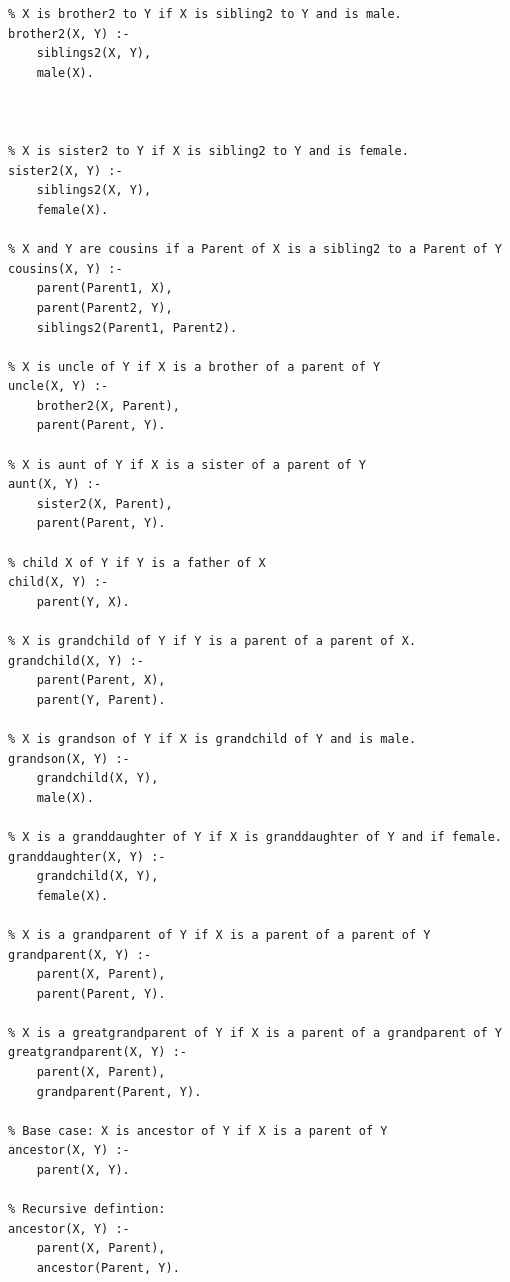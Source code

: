 \documentclass{article}
\begin{document}
\begin{verbatim}
% X is brother2 to Y if X is sibling2 to Y and is male.
brother2(X, Y) :-
    siblings2(X, Y),
    male(X).



% X is sister2 to Y if X is sibling2 to Y and is female.
sister2(X, Y) :-
    siblings2(X, Y),
    female(X).

% X and Y are cousins if a Parent of X is a sibling2 to a Parent of Y
cousins(X, Y) :-
    parent(Parent1, X),
    parent(Parent2, Y),
    siblings2(Parent1, Parent2).

% X is uncle of Y if X is a brother of a parent of Y
uncle(X, Y) :-
    brother2(X, Parent),
    parent(Parent, Y).

% X is aunt of Y if X is a sister of a parent of Y
aunt(X, Y) :-
    sister2(X, Parent),
    parent(Parent, Y).

% child X of Y if Y is a father of X
child(X, Y) :-
    parent(Y, X).

% X is grandchild of Y if Y is a parent of a parent of X.
grandchild(X, Y) :-
    parent(Parent, X),
    parent(Y, Parent).

% X is grandson of Y if X is grandchild of Y and is male.
grandson(X, Y) :-
    grandchild(X, Y),
    male(X).

% X is a granddaughter of Y if X is granddaughter of Y and if female.
granddaughter(X, Y) :-
    grandchild(X, Y),
    female(X).

% X is a grandparent of Y if X is a parent of a parent of Y
grandparent(X, Y) :-
    parent(X, Parent),
    parent(Parent, Y).

% X is a greatgrandparent of Y if X is a parent of a grandparent of Y
greatgrandparent(X, Y) :-
    parent(X, Parent),
    grandparent(Parent, Y).

% Base case: X is ancestor of Y if X is a parent of Y
ancestor(X, Y) :-
    parent(X, Y).

% Recursive defintion:
ancestor(X, Y) :-
    parent(X, Parent),
    ancestor(Parent, Y).
\end{verbatim}
	
\paragraph{}\
\end{document}
